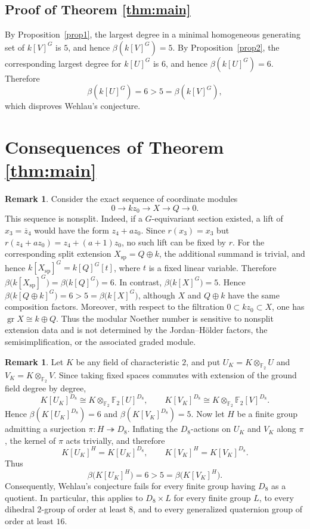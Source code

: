 \documentclass[11pt]{article}
\theoremstyle{definition}
\newtheorem{remark}[theorem]{Remark}
\begin{document}
	\subsection*{Proof of Theorem \ref{thm:main}}
	By Proposition~\ref{prop1}, the largest degree in a minimal homogeneous generating set of $k[V]^G$ is $5$, and hence $\beta(k[V]^G)=5$. By Proposition~\ref{prop2}, the corresponding largest degree for $k[U]^G$ is $6$, and hence $\beta(k[U]^G)=6$. Therefore
	\[
	\beta(k[U]^G)=6>5=\beta(k[V]^G),
	\]
	which disproves Wehlau's conjecture.
	
	\section{Consequences of Theorem \ref{thm:main}}
	
	\begin{remark}
		Consider the exact sequence of coordinate modules
		\[
		0\longrightarrow kz_0\longrightarrow X\longrightarrow Q\longrightarrow0.
		\]
		This sequence is nonsplit. Indeed, if a $G$-equivariant section existed, a lift of $x_3=\overline z_4$ would have the form $z_4+az_0$. Since $r(x_3)=x_3$ but $r(z_4+az_0)=z_4+(a+1)z_0$, no such lift can be fixed by $r$.
		For the corresponding split extension \(X_{\mathrm{sp}}=Q\oplus k\), the additional summand is trivial, and hence $k[X_{\mathrm{sp}}]^G=k[Q]^G[t]$, where \(t\) is a fixed linear variable. Therefore $\beta\bigl(k[X_{\mathrm{sp}}]^G\bigr)=\beta\bigl(k[Q]^G\bigr)=6$. In contrast, $\beta\bigl(k[X]^G\bigr)=5$. Hence $\beta\bigl(k[Q\oplus k]^G\bigr)=6>5=\beta\bigl(k[X]^G\bigr)$, although \(X\) and \(Q\oplus k\) have the same composition factors. Moreover, with respect to the filtration $0\subset kz_0\subset X$, one has $\operatorname{gr}X\cong k\oplus Q$. Thus the modular Noether number is sensitive to nonsplit extension data and is not determined by the Jordan--H\"older factors, the semisimplification, or the associated graded module.
	\end{remark}
	
	\begin{remark}
		Let $K$ be any field of characteristic $2$, and put $U_K=K\otimes_{\mathbb F_2}U$ and $V_K=K\otimes_{\mathbb F_2}V$. Since taking fixed spaces commutes with extension of the ground field degree by degree,
		\[
		K[U_K]^{D_8}\cong K\otimes_{\mathbb F_2}\mathbb F_2[U]^{D_8},
		\qquad
		K[V_K]^{D_8}\cong K\otimes_{\mathbb F_2}\mathbb F_2[V]^{D_8}.
		\]
		Hence $\beta(K[U_K]^{D_8})=6$ and $\beta(K[V_K]^{D_8})=5$.
		Now let $H$ be a finite group admitting a surjection $\pi:H\twoheadrightarrow D_8$. Inflating the $D_8$-actions on $U_K$ and $V_K$ along $\pi$, the kernel of $\pi$ acts trivially, and therefore
		\[
		K[U_K]^H=K[U_K]^{D_8},
		\qquad
		K[V_K]^H=K[V_K]^{D_8}.
		\]
		Thus
		\[
		\beta\bigl(K[U_K]^H\bigr)=6>5=\beta\bigl(K[V_K]^H\bigr).
		\]
		Consequently, Wehlau's conjecture fails for every finite group having $D_8$ as a quotient. In particular, this applies to $D_8\times L$ for every finite group $L$, to every dihedral $2$-group of order at least $8$, and to every generalized quaternion group of order at least $16$.
	\end{remark}
	
\end{document}
